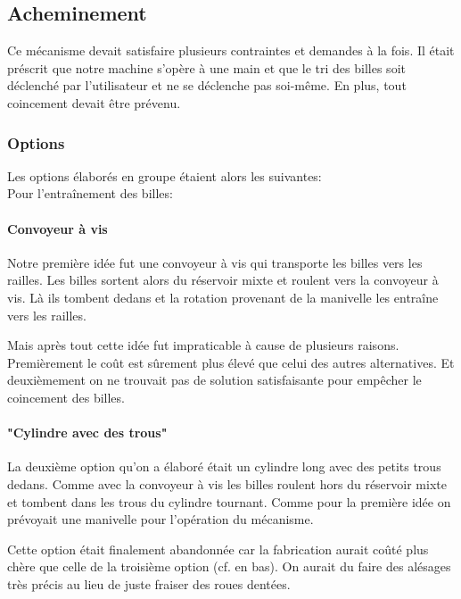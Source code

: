 
\subsection{Acheminement}
Ce mécanisme devait satisfaire plusieurs contraintes et demandes à la fois. Il était préscrit que notre machine s'opère à une main et que le tri des billes soit déclenché par l'utilisateur et ne se déclenche pas soi-même. En plus, tout coincement devait être prévenu.

\subsubsection{Options}
Les options élaborés en groupe étaient alors les suivantes:\\
Pour l'entraînement des billes:

\paragraph{Convoyeur à vis}
Notre première idée fut une convoyeur à vis qui transporte les billes vers les railles. Les billes sortent alors du réservoir mixte et roulent vers la convoyeur à vis. Là ils tombent dedans et la rotation provenant de la manivelle les entraîne vers les railles.


Mais après tout cette idée fut impraticable à cause de plusieurs raisons. Premièrement le coût est sûrement plus élevé que celui des autres alternatives. Et deuxièmement on ne trouvait pas de solution satisfaisante pour empêcher le coincement des billes.

\paragraph{"Cylindre avec des trous"}
La deuxième option qu'on a élaboré était un cylindre long avec des petits trous dedans. Comme avec la convoyeur à vis les billes roulent hors du réservoir mixte et tombent dans les trous du cylindre tournant. Comme pour la première idée on prévoyait une manivelle pour l'opération du mécanisme.


Cette option était finalement abandonnée car la fabrication aurait coûté plus chère que celle de la troisième option (cf. en bas). On aurait du faire des alésages très précis au lieu de juste fraiser des roues dentées.

